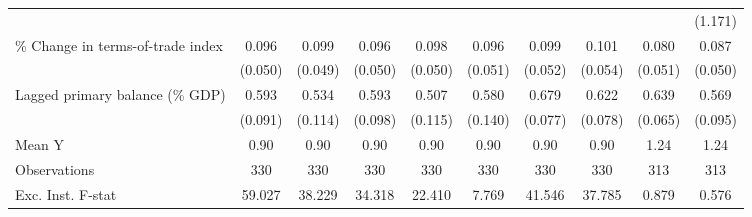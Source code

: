 {\begin{tabular}{l*{9}{c}}
                    &                     &                     &                     &                     &                     &                     &                     &                     &     (1.171)         \\
\addlinespace
\% Change in terms-of-trade index&       0.096\sym{*}  &       0.099\sym{**} &       0.096\sym{*}  &       0.098\sym{**} &       0.096\sym{*}  &       0.099\sym{*}  &       0.101\sym{*}  &       0.080         &       0.087\sym{*}  \\
                    &     (0.050)         &     (0.049)         &     (0.050)         &     (0.050)         &     (0.051)         &     (0.052)         &     (0.054)         &     (0.051)         &     (0.050)         \\
\addlinespace
Lagged primary balance (\% GDP)&       0.593\sym{***}&       0.534\sym{***}&       0.593\sym{***}&       0.507\sym{***}&       0.580\sym{***}&       0.679\sym{***}&       0.622\sym{***}&       0.639\sym{***}&       0.569\sym{***}\\
                    &     (0.091)         &     (0.114)         &     (0.098)         &     (0.115)         &     (0.140)         &     (0.077)         &     (0.078)         &     (0.065)         &     (0.095)         \\
\midrule
Mean Y              &        0.90         &        0.90         &        0.90         &        0.90         &        0.90         &        0.90         &        0.90         &        1.24         &        1.24         \\
Observations        &         330         &         330         &         330         &         330         &         330         &         330         &         330         &         313         &         313         \\
Exc. Inst. F-stat   &      59.027         &      38.229         &      34.318         &      22.410         &       7.769         &      41.546         &      37.785         &       0.879         &       0.576         \\
\bottomrule
\end{tabular}
}
